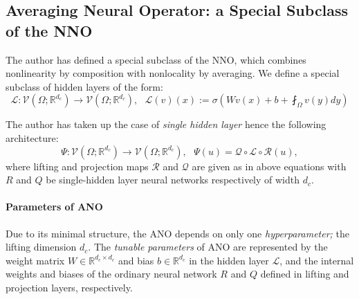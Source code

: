 \documentclass[reqno]{amsart}
\theoremstyle{plain}
\theoremstyle{definition}
\newcommand{\bb}[1]{\mathbb{#1}}
\newcommand{\cal}[1]{\mathcal{#1}}
\begin{document}
\subsection{\bf Averaging Neural Operator: a Special Subclass of the NNO}
The author has defined a special subclass of the NNO, which combines nonlinearity by composition with nonlocality by averaging. We define a special subclass of hidden layers of the form:
\begin{equation}\label{1}
    \cal L : \cal V(\Omega;\bb R^{d_c}) \to \cal V(\Omega;\bb R^{d_c}),~~~ \cal L(v)(x) := \sigma\left(Wv(x) + b+ \fint_\Omega v(y) dy \right)
\end{equation}

\noindent The author has taken up the case of {\it single hidden layer} hence the following architecture:
$$ \Psi:\cal V(\Omega;\bb R^{d_c}) \to \cal V(\Omega;\bb R^{d_c}),~~~ \Psi(u) = \cal Q \circ \cal L \circ \cal R(u),$$
where lifting and projection maps $\cal R$ and $\cal Q$ are given as in above equations with $R$ and $Q$ be single-hidden layer neural networks respectively of width $d_c$. 
\paragraph{\bf Parameters of ANO} Due to its minimal structure, the ANO depends on only one {\it hyperparameter;} the lifting dimension $d_c$. The {\it tunable parameters} of ANO are represented by the weight matrix $W \in \bb R^{d_c\times d_c}$ and bias $b \in \bb R^{d_c}$ in the hidden layer $\cal L$, and the internal weights and biases of the ordinary neural network $R$ and $Q$ defined in lifting and projection layers, respectively.
\end{document}
